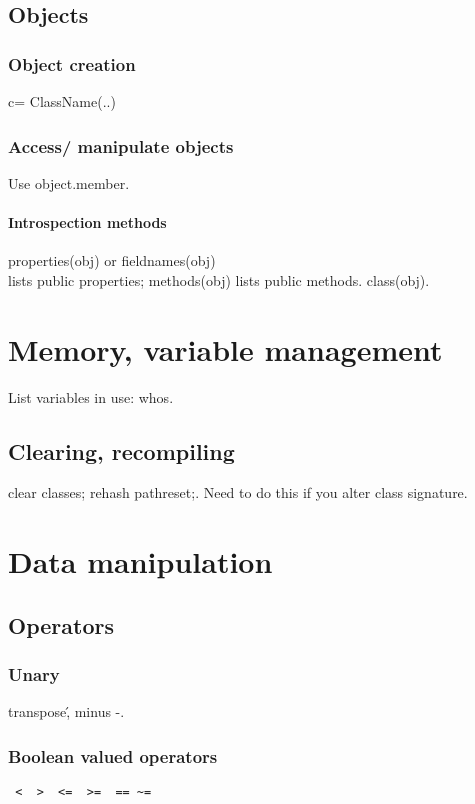\subsection{Objects}
\subsubsection{Object creation}
c= ClassName(..)

\subsubsection{Access/ manipulate objects}
Use object.member.

\paragraph*{Introspection methods}
properties(obj) or fieldnames(obj) \\
lists public properties; methods(obj) lists public methods. class(obj).


\section{Memory, variable management}
List variables in use: whos.

\subsection{Clearing, recompiling}
clear classes; rehash pathreset;. Need to do this if you alter class signature.

\section{Data manipulation}
\subsection{Operators}
\subsubsection{Unary}
transpose\', minus -.

\subsubsection{Boolean valued operators}
\begin{verbatim}
 <  >  <=  >=  == ~=
\end{verbatim}

